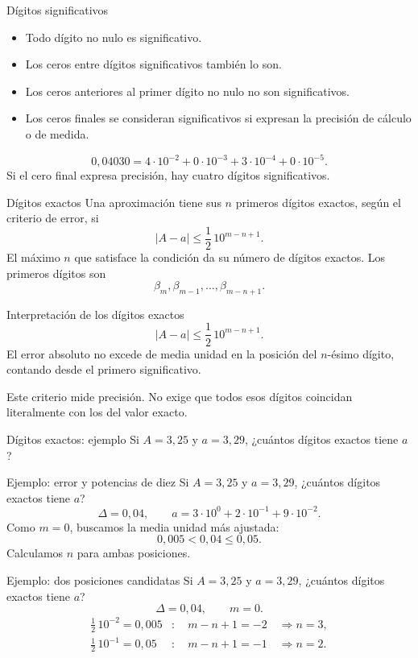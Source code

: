 \documentclass[main.tex]{subfiles}
\begin{document}
\begin{frame}{Dígitos significativos}
\begin{itemize}\item Todo dígito no nulo es significativo.\item Los ceros entre dígitos significativos también lo son.\item Los ceros anteriores al primer dígito no nulo no son significativos.\item Los ceros finales se consideran significativos si expresan la precisión de cálculo o de medida.\end{itemize}\[0{,}04030=4\cdot10^{-2}+0\cdot10^{-3}+3\cdot10^{-4}+0\cdot10^{-5}.\]Si el cero final expresa precisión, hay cuatro dígitos significativos.
\end{frame}

\begin{frame}{Dígitos exactos}
Una aproximación tiene sus $n$ primeros dígitos exactos, según el criterio de error, si\[\boxed{|A-a|\le\frac12\,10^{m-n+1}.}\]El máximo $n$ que satisface la condición da su número de dígitos exactos. Los primeros dígitos son\[\beta_m,\beta_{m-1},\ldots,\beta_{m-n+1}.\]
\end{frame}

\begin{frame}{Interpretación de los dígitos exactos}
\[|A-a|\le\frac12\,10^{m-n+1}.\]El error absoluto no excede de media unidad en la posición del $n$-ésimo dígito, contando desde el primero significativo.\par\medskip Este criterio mide precisión. No exige que todos esos dígitos coincidan literalmente con los del valor exacto.
\end{frame}

\begin{frame}{Dígitos exactos: ejemplo}
Si $A=3{,}25$ y $a=3{,}29$, ¿cuántos dígitos exactos tiene $a$?
\end{frame}

\begin{frame}{Ejemplo: error y potencias de diez}
Si $A=3{,}25$ y $a=3{,}29$, ¿cuántos dígitos exactos tiene $a$?\[\Delta=0{,}04,\qquad a=3\cdot10^0+2\cdot10^{-1}+9\cdot10^{-2}.\]Como $m=0$, buscamos la media unidad más ajustada:\[0{,}005<0{,}04\le0{,}05.\]Calculamos $n$ para ambas posiciones.
\end{frame}

\begin{frame}{Ejemplo: dos posiciones candidatas}
Si $A=3{,}25$ y $a=3{,}29$, ¿cuántos dígitos exactos tiene $a$?\[\Delta=0{,}04,\qquad m=0.\]\begin{align*}\tfrac12\,10^{-2}=0{,}005&:\quad m-n+1=-2\quad\Longrightarrow n=3,\\\tfrac12\,10^{-1}=0{,}05&:\quad m-n+1=-1\quad\Longrightarrow n=2.\end{align*}
\end{frame}
\end{document}
